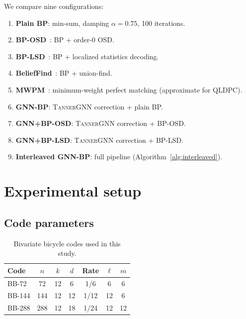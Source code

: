 \documentclass[a4paper,twocolumn,11pt,unpublished,nopdfoutputerror]{quantumarticle}
\begin{document}
We compare nine configurations:
\begin{enumerate}[leftmargin=*,topsep=2pt,itemsep=1pt,label=(\arabic*)]
\item \textbf{Plain BP}: min-sum, damping $\alpha = 0.75$, 100 iterations.
\item \textbf{BP-OSD}~\cite{Fossorier1995OSD,Roffe2020Landscape}: BP + order-0 OSD.
\item \textbf{BP-LSD}~\cite{Panteleev2021QLDPC}: BP + localized statistics decoding.
\item \textbf{BeliefFind}~\cite{Delfosse2021UF}: BP + union-find.
\item \textbf{MWPM}~\cite{Higgott2022PyMatching}: minimum-weight perfect matching (approximate for QLDPC).
\item \textbf{GNN-BP}: \textsc{TannerGNN} correction + plain BP.
\item \textbf{GNN+BP-OSD}: \textsc{TannerGNN} correction + BP-OSD.
\item \textbf{GNN+BP-LSD}: \textsc{TannerGNN} correction + BP-LSD.
\item \textbf{Interleaved GNN-BP}: full pipeline (Algorithm~\ref{alg:interleaved}).
\end{enumerate}


\section{Experimental setup}\label{sec:setup}

\subsection{Code parameters}

\begin{table}[t]
\centering
\caption{Bivariate bicycle codes used in this study.}
\label{tab:codes}
\begin{tabular}{@{}lcccccc@{}}
\toprule
Code & $n$ & $k$ & $d$ & Rate & $\ell$ & $m$ \\
\midrule
BB-72  & 72  & 12 & 6  & 1/6  & 6  & 6  \\
BB-144 & 144 & 12 & 12 & 1/12 & 12 & 6  \\
BB-288 & 288 & 12 & 18 & 1/24 & 12 & 12 \\
\bottomrule
\end{tabular}
\end{table}
\end{document}
